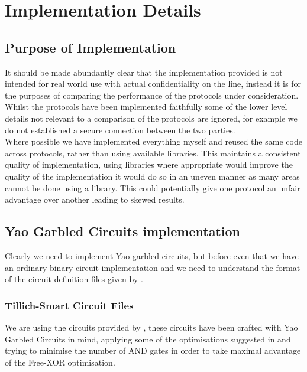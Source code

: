 \documentclass[ %
                    author={Nicholas Tutte},
                supervisor={Prof. Nigel Smart},
                    degree={MEng},
                     title={Secure Two Party Computation},
                  subtitle={A practical comparison of recent protocols},
                      type={Research - GG1K},
                      year={2015} ]{dissertation}
\begin{document}
	\chapter{Implementation Details} \label{sec:ImplementationDetails}
		\section*{Purpose of Implementation}
			It should be made abundantly clear that the implementation provided is not intended for real world use with actual confidentiality on the line, instead it is for the purposes of comparing the performance of the protocols under consideration.\\

			Whilst the protocols have been implemented faithfully some of the lower level details not relevant to a comparison of the protocols are ignored, for example we do not established a secure connection between the two parties.\\

			Where possible we have implemented everything myself and reused the same code across protocols, rather than using available libraries. This maintains a consistent quality of implementation, using libraries where appropriate would improve the quality of the implementation it would do so in an uneven manner as many areas cannot be done using a library. This could potentially give one protocol an unfair advantage over another leading to skewed results.

		\section{Yao Garbled Circuits implementation}

			Clearly we need to implement Yao garbled circuits, but before even that we have an ordinary binary circuit implementation and we need to understand the format of the circuit definition files given by \cite{NigelCircuits}.

			\subsection{Tillich-Smart Circuit Files}

				We are using the circuits provided by \cite{NigelCircuits}, these circuits have been crafted with Yao Garbled Circuits in mind, applying some of the optimisations suggested in \cite{SMC_Is_Practical} and trying to minimise the number of AND gates in order to take maximal advantage of the Free-XOR optimisation.\\
\end{document}
